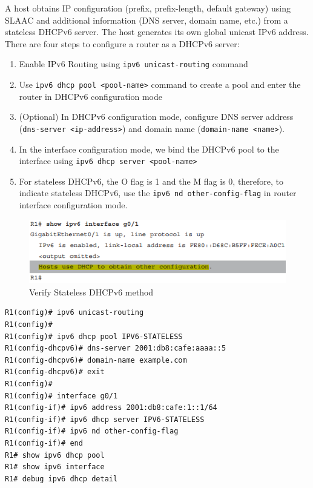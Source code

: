 A host obtains IP configuration (prefix, prefix-length, default gateway) using SLAAC and additional information (DNS server, domain name, etc.) from a stateless DHCPv6 server. The host generates its own global unicast IPv6 address. \\

There are four steps to configure a router as a DHCPv6 server:

\begin{enumerate}
\item Enable IPv6 Routing using \verb|ipv6 unicast-routing| command
\item Use \verb|ipv6 dhcp pool <pool-name>| command to create a pool and enter the router in DHCPv6 configuration mode
\item (Optional) In DHCPv6 configuration mode, configure DNS server address (\verb|dns-server <ip-address>|) and domain name (\verb|domain-name <name>|).
\item In the interface configuration mode, we bind the DHCPv6 pool to the interface using \verb|ipv6 dhcp server <pool-name>|
\item For stateless DHCPv6, the O flag is 1 and the M flag is 0, therefore, to indicate stateless DHCPv6, use the \verb|ipv6 nd other-config-flag| in router interface configuration mode.
\end{enumerate}

\begin{figure}[hbtp]
\caption{Verify Stateless DHCPv6 method}
\centering
\includegraphics[scale=0.8]{pictures/Stateless-DHCPv6.PNG}
\end{figure}


\begin{verbatim}
R1(config)# ipv6 unicast-routing
R1(config)#
R1(config)# ipv6 dhcp pool IPV6-STATELESS
R1(config-dhcpv6)# dns-server 2001:db8:cafe:aaaa::5
R1(config-dhcpv6)# domain-name example.com
R1(config-dhcpv6)# exit
R1(config)#
R1(config)# interface g0/1
R1(config-if)# ipv6 address 2001:db8:cafe:1::1/64
R1(config-if)# ipv6 dhcp server IPV6-STATELESS
R1(config-if)# ipv6 nd other-config-flag
R1(config-if)# end
R1# show ipv6 dhcp pool 
R1# show ipv6 interface
R1# debug ipv6 dhcp detail
\end{verbatim}

